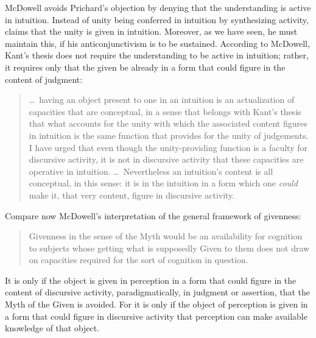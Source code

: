 \documentclass[12pt]{article}
\begin{document}
McDowell avoids Prichard's objection by denying that the understanding is active in intuition. Instead of unity being conferred in intuition by synthesizing activity, \citet[7]{McDowell:2008fk} claims that the unity is given in intuition. Moreover, as we have seen, he must maintain this, if his anticonjunctivism is to be sustained. According to McDowell, Kant's \citeyearpar[A79/B104--5]{Kant:1781fk} thesis does not require the understanding to be active in intuition; rather, it requires only that the given be already in a form that could figure in the content of judgment:
\begin{quote}
	\ldots\ having an object present to one in an intuition is an actualization of capacities that are conceptual, in a sense that belongs with Kant's thesis that what accounts for the unity with which the associated content figures in intuition is the same function that provides for the unity of judgements. I have urged that even though the unity-providing function is a faculty for discursive activity, it is not in discursive activity that these capacities are operative in intuition. \ldots\ Nevertheless an intuition's content is all conceptual, in this sense: it is in the intuition in a form which one \emph{could} make it, that very content, figure in discursive activity. \citep[265]{McDowell:2008fk}
\end{quote}
Compare now McDowell's interpretation of the general framework of givenness:
\begin{quote}
	Givenness in the sense of the Myth would be an availability for cognition to subjects whose getting what is supposedly Given to them does not draw on capacities required for the sort of cognition in question. \citep[256]{McDowell:2008fk}
\end{quote}
It is only if the object is given in perception in a form that could figure in the content of discursive activity, paradigmatically, in judgment or assertion, that the Myth of the Given is avoided. For it is only if the object of perception is given in a form that could figure in discursive activity that perception can make available knowledge of that object. 
\end{document}
